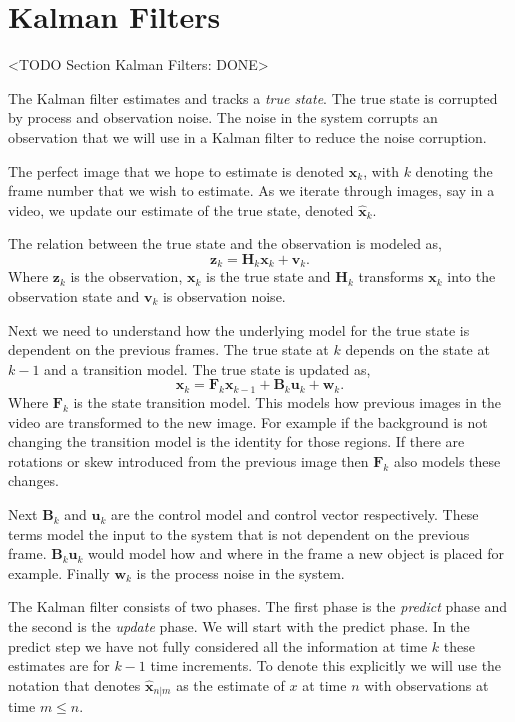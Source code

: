 \section{Kalman Filters}
	<TODO Section Kalman Filters: DONE>

The Kalman filter estimates and tracks a \emph{true state}. The true state is corrupted by process and observation noise. The noise in the system corrupts an observation that we will use in a Kalman filter to reduce the noise corruption. 

The perfect image that we hope to estimate is denoted $\mathbf{x}_k$, with $k$ denoting the frame number that we wish to estimate. As we iterate through images, say in a video, we update our estimate of the true state, denoted $\hat{\mathbf{x}}_k$.

The relation between the true state and the observation is modeled as,
\begin{equation}
\mathbf{z}_k = \mathbf{H}_k\mathbf{x}_{k} + \mathbf{v}_k.
\end{equation}
\noindent 
Where $\mathbf{z}_k$ is the observation, $\mathbf{x}_k$ is the true state and $\mathbf{H}_k$ transforms $\mathbf{x}_k$ into the observation state and $\mathbf{v}_k$ is observation noise. 

Next we need to understand how the underlying model for the true state is dependent on the previous frames. The true state at $k$ depends on the state at $k-1$ and a transition model. The true state is updated as,	
\begin{equation}
\mathbf{x}_k = \mathbf{F}_k\mathbf{x}_{k-1} + \mathbf{B}_k\mathbf{u}_{k} + \mathbf{w}_k.
\end{equation}
\noindent
Where $\mathbf{F}_k$ is the state transition model. This models how previous images in the video are transformed to the new image. For example if the background is not changing the transition model is the identity for those regions. If there are rotations or skew introduced from the previous image then $\mathbf{F}_k$ also models these changes.

Next $\mathbf{B}_k$ and $\mathbf{u}_{k}$ are the control model and control vector respectively. These terms model the input to the system that is not dependent on the previous frame. $\mathbf{B}_k\mathbf{u}_{k}$ would model how and where in the frame a new object is placed for example. Finally $\mathbf{w}_k$ is the process noise in the system.

The Kalman filter consists of two phases. The first phase is the \emph{predict} phase and the second is the \emph{update} phase. We will start with the predict phase. In the predict step we have not fully considered all the information at time $k$ these estimates are for $k-1$ time increments. To denote this explicitly we will use the notation that denotes $\hat{\mathbf{x}}_{n|m}$ as the estimate of $x$ at time $n$ with observations at time $m\leq n$.

